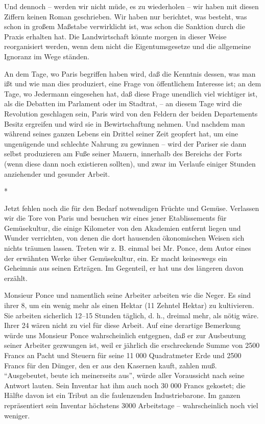 \documentclass{scrbook}
\begin{document}
Und dennoch – werden wir nicht müde, es zu wiederholen – wir haben mit diesen Ziffern keinen Roman geschrieben. Wir haben nur berichtet, was besteht, was schon in großem Maßstabe verwirklicht ist, was schon die Sanktion durch die Praxis erhalten hat. Die Landwirtschaft könnte morgen in dieser Weise reorganisiert werden, wenn dem nicht die Eigentumsgesetze und die allgemeine Ignoranz im Wege ständen.

An dem Tage, wo Paris begriffen haben wird, daß die Kenntnis dessen, was man ißt und wie man dies produziert, eine Frage von öffentlichem Interesse ist; an dem Tage, wo Jedermann eingesehen hat, daß diese Frage unendlich viel wichtiger ist, als die Debatten im Parlament oder im Stadtrat, – an diesem Tage wird die Revolution geschlagen sein, Paris wird von den Feldern der beiden Departements Besitz ergreifen und wird sie in Bewirtschaftung nehmen. Und nachdem man während seines ganzen Lebens ein Drittel seiner Zeit geopfert hat, um eine ungenügende und schlechte Nahrung zu gewinnen – wird der Pariser sie dann selbst produzieren am Fuße seiner Mauern, innerhalb des Bereichs der Forts (wenn diese dann noch existieren sollten), und zwar im Verlaufe einiger Stunden anziehender und gesunder Arbeit.

\begin{center}*\end{center}

Jetzt fehlen noch die für den Bedarf notwendigen Früchte und Gemüse. Verlassen wir die Tore von Paris und besuchen wir eines jener Etablissements für Gemüsekultur, die einige Kilometer von den Akademien entfernt liegen und Wunder verrichten, von denen die dort hausenden ökonomischen Weisen sich nichts träumen lassen. Treten wir z. B. einmal bei Mr. Ponce, dem Autor eines der erwähnten Werke über Gemüsekultur, ein. Er macht keineswegs ein Geheimnis aus seinen Erträgen. Im Gegenteil, er hat uns des längeren davon erzählt.

Monsieur Ponce und namentlich seine Arbeiter arbeiten wie die Neger. Es sind ihrer 8, um ein wenig mehr als einen Hektar (11 Zehntel Hektar) zu kultivieren. Sie arbeiten sicherlich 12–15 Stunden täglich, d. h., dreimal mehr, als nötig wäre. Ihrer 24 wären nicht zu viel für diese Arbeit. Auf eine derartige Bemerkung würde uns Monsieur Ponce wahrscheinlich entgegnen, daß er zur Ausbeutung seiner Arbeiter gezwungen ist, weil er jährlich die erschreckende Summe von 2500 Francs an Pacht und Steuern für seine 11 000 Quadratmeter Erde und 2500 Francs für den Dünger, den er aus den Kasernen kauft, zahlen muß. ``Ausgebeutet, beute ich meinerseits aus'', würde aller Voraussicht nach seine Antwort lauten. Sein Inventar hat ihm auch noch 30 000 Francs gekostet; die Hälfte davon ist ein Tribut an die faulenzenden Industriebarone. Im ganzen repräsentiert sein Inventar höchstens 3000 Arbeitstage – wahrscheinlich noch viel weniger.
\end{document}
